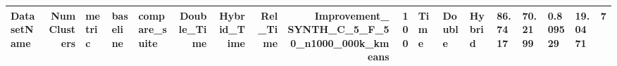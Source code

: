 \begin{tabular}{lrlllrrrrr}
\toprule
DatasetName & NumClusters & metric & baseline & compare_suite & Double_Time & Hybrid_Time & Rel_Time & Improvement_%
\midrule
SYNTH_C_5_F_50_n1000_000k_kmeans & 100 & Time & Double & Hybrid & 86.7417 & 70.2199 & 0.809529 & 19.0471 & 7 \\
\bottomrule
\end{tabular}
